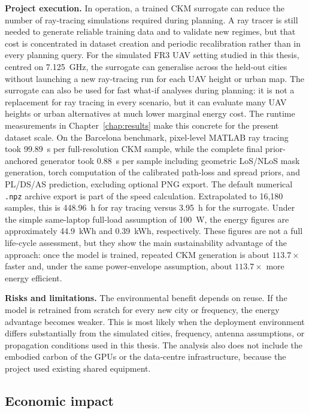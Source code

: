 \textbf{Project execution.} In operation, a trained CKM surrogate can reduce
the number of ray-tracing simulations required during planning. A ray tracer is
still needed to generate reliable training data and to validate new regimes,
but that cost is concentrated in dataset creation and periodic recalibration
rather than in every planning query. For the simulated FR3 UAV setting studied
in this thesis, centred on \SI{7.125}{GHz}, the surrogate can generalise across
the held-out cities without launching a new ray-tracing run for each UAV height
or urban map.
The surrogate can also be used for fast what-if analyses during planning:
it is not a replacement for ray tracing in every scenario, but it can evaluate
many UAV heights or urban alternatives at much lower marginal energy cost.
The runtime measurements in Chapter~\ref{chap:results} make this concrete for
the present dataset scale. On the Barcelona benchmark, pixel-level MATLAB ray
tracing took \SI{99.89}{s} per full-resolution CKM sample, while the complete
final prior-anchored generator took \SI{0.88}{s} per sample including
geometric LoS/NLoS mask generation, torch computation of the calibrated
path-loss and spread priors, and PL/DS/AS prediction, excluding optional PNG
export. The default numerical \texttt{.npz} archive export is part of the
speed calculation.
Extrapolated to 16{,}180 samples, this is \SI{448.96}{h} for ray tracing versus
\SI{3.95}{h} for the surrogate. Under the simple same-laptop full-load
assumption of \SI{100}{W}, the energy figures are approximately
\SI{44.9}{kWh} and \SI{0.39}{kWh}, respectively. These figures are not a full
life-cycle assessment, but they show the main sustainability advantage of the
approach: once the model is trained, repeated CKM generation is about
\(113.7\times\) faster and, under the same power-envelope assumption, about
\(113.7\times\) more energy efficient.


\textbf{Risks and limitations.} The environmental benefit depends on reuse. If
the model is retrained from scratch for every new city or frequency, the energy
advantage becomes weaker. This is most likely when the deployment environment
differs substantially from the simulated cities, frequency, antenna assumptions,
or propagation conditions used in this thesis.
The analysis also does not include the embodied carbon of the GPUs or the data-centre infrastructure,
because the project used existing shared equipment.

\subsection{Economic impact}

